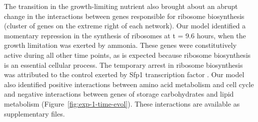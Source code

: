 \documentclass{bioinfo}
\begin{document}
The transition in the growth-limiting nutrient also brought about an
abrupt change in the interactions between genes responsible for
ribosome biosynthesis (cluster of genes on the extreme right of each
network). Our model identified a momentary repression in the synthesis
of ribosomes at t = 9.6 hours, when the growth limitation was exerted
by ammonia. These genes were constitutively active during all other
time points, as is expected because ribosome biosynthesis is an
essential cellular process. The temporary arrest in ribosome
biosynthesis was attributed to the control exerted by Sfp1
transcription factor \citep{Farzadfard2010}. Our model also identified
positive interactions between amino acid metabolism and cell cycle and
negative interactions between genes of storage carbohydrates and lipid
metabolism (Figure~\ref{fig:exp-1-time-evol}). These interactions are
available as supplementary files. 
\end{document}
